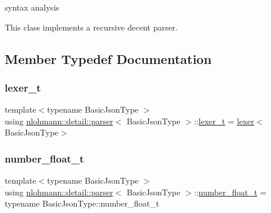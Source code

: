 syntax analysis 

This class implements a recursive decent parser. 

\subsection{Member Typedef Documentation}
\mbox{\label{classnlohmann_1_1detail_1_1parser_a16030c5af158a94d1c799f82ff3a0147}} 
\subsubsection{\texorpdfstring{lexer\_t}{lexer\_t}}
{\footnotesize\ttfamily template$<$typename Basic\+Json\+Type $>$ \\
using \mbox{\hyperlink{classnlohmann_1_1detail_1_1parser}{nlohmann\+::detail\+::parser}}$<$ Basic\+Json\+Type $>$\+::\mbox{\hyperlink{classnlohmann_1_1detail_1_1parser_a16030c5af158a94d1c799f82ff3a0147}{lexer\+\_\+t}} =  \mbox{\hyperlink{classnlohmann_1_1detail_1_1lexer}{lexer}}$<$Basic\+Json\+Type$>$\hspace{0.3cm}{\ttfamily [private]}}

\mbox{\label{classnlohmann_1_1detail_1_1parser_a8ca8e734da0632c2731fc3b9547dcf28}} 
\subsubsection{\texorpdfstring{number\_float\_t}{number\_float\_t}}
{\footnotesize\ttfamily template$<$typename Basic\+Json\+Type $>$ \\
using \mbox{\hyperlink{classnlohmann_1_1detail_1_1parser}{nlohmann\+::detail\+::parser}}$<$ Basic\+Json\+Type $>$\+::\mbox{\hyperlink{classnlohmann_1_1detail_1_1parser_a8ca8e734da0632c2731fc3b9547dcf28}{number\+\_\+float\+\_\+t}} =  typename Basic\+Json\+Type\+::number\+\_\+float\+\_\+t\hspace{0.3cm}{\ttfamily [private]}}

